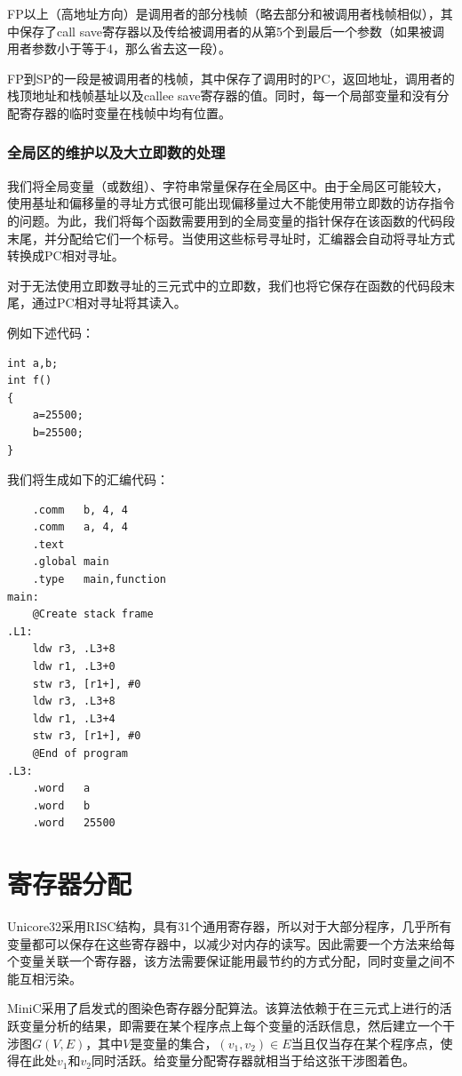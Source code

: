 FP以上（高地址方向）是调用者的部分栈帧（略去部分和被调用者栈帧相似），其中保存了call save寄存器以及传给被调用者的从第5个到最后一个参数（如果被调用者参数小于等于4，那么省去这一段）。

FP到SP的一段是被调用者的栈帧，其中保存了调用时的PC，返回地址，调用者的栈顶地址和栈帧基址以及callee save寄存器的值。同时，每一个局部变量和没有分配寄存器的临时变量在栈帧中均有位置。


\subsubsection{全局区的维护以及大立即数的处理}
我们将全局变量（或数组）、字符串常量保存在全局区中。由于全局区可能较大，使用基址和偏移量的寻址方式很可能出现偏移量过大不能使用带立即数的访存指令的问题。为此，我们将每个函数需要用到的全局变量的指针保存在该函数的代码段末尾，并分配给它们一个标号。当使用这些标号寻址时，汇编器会自动将寻址方式转换成PC相对寻址。

对于无法使用立即数寻址的三元式中的立即数，我们也将它保存在函数的代码段末尾，通过PC相对寻址将其读入。

例如下述代码：
\begin{lstlisting}
int a,b;
int f()
{
	a=25500;
	b=25500;
}

\end{lstlisting}
我们将生成如下的汇编代码：
\begin{verbatim}
	.comm	b, 4, 4
	.comm	a, 4, 4
	.text
	.global	main
	.type	main,function
main:
	@Create stack frame
.L1:
	ldw	r3, .L3+8
	ldw	r1, .L3+0
	stw	r3, [r1+], #0
	ldw	r3, .L3+8
	ldw	r1, .L3+4
	stw	r3, [r1+], #0
	@End of program
.L3:
	.word	a
	.word	b
	.word	25500
\end{verbatim}
\section{寄存器分配}
\label{registeralloc}
Unicore32采用RISC结构，具有31个通用寄存器，所以对于大部分程序，几乎所有变量都可以保存在这些寄存器中，以减少对内存的读写。因此需要一个方法来给每个变量关联一个寄存器，该方法需要保证能用最节约的方式分配，同时变量之间不能互相污染。

MiniC采用了启发式的图染色寄存器分配算法。该算法依赖于在三元式上进行的活跃变量分析的结果，即需要在某个程序点上每个变量的活跃信息，然后建立一个干涉图$G(V,E)$，其中$V$是变量的集合，$(v_1,v_2)\in E$当且仅当存在某个程序点，使得在此处$v_1$和$v_2$同时活跃。给变量分配寄存器就相当于给这张干涉图着色。

